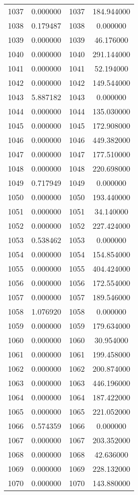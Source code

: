 \documentclass[12pt]{article}
\begin{document}
\begin{longtable}{@{}cccc@{}}
1037 & 0.000000 & 1037 & 184.944000 \\
1038 & 0.179487 & 1038 & 0.000000 \\
1039 & 0.000000 & 1039 & 46.176000 \\
1040 & 0.000000 & 1040 & 291.144000 \\
1041 & 0.000000 & 1041 & 52.194000 \\
1042 & 0.000000 & 1042 & 149.544000 \\
1043 & 5.887182 & 1043 & 0.000000 \\
1044 & 0.000000 & 1044 & 135.030000 \\
1045 & 0.000000 & 1045 & 172.908000 \\
1046 & 0.000000 & 1046 & 449.382000 \\
1047 & 0.000000 & 1047 & 177.510000 \\
1048 & 0.000000 & 1048 & 220.698000 \\
1049 & 0.717949 & 1049 & 0.000000 \\
1050 & 0.000000 & 1050 & 193.440000 \\
1051 & 0.000000 & 1051 & 34.140000 \\
1052 & 0.000000 & 1052 & 227.424000 \\
1053 & 0.538462 & 1053 & 0.000000 \\
1054 & 0.000000 & 1054 & 154.854000 \\
1055 & 0.000000 & 1055 & 404.424000 \\
1056 & 0.000000 & 1056 & 172.554000 \\
1057 & 0.000000 & 1057 & 189.546000 \\
1058 & 1.076920 & 1058 & 0.000000 \\
1059 & 0.000000 & 1059 & 179.634000 \\
1060 & 0.000000 & 1060 & 30.954000 \\
1061 & 0.000000 & 1061 & 199.458000 \\
1062 & 0.000000 & 1062 & 200.874000 \\
1063 & 0.000000 & 1063 & 446.196000 \\
1064 & 0.000000 & 1064 & 187.422000 \\
1065 & 0.000000 & 1065 & 221.052000 \\
1066 & 0.574359 & 1066 & 0.000000 \\
1067 & 0.000000 & 1067 & 203.352000 \\
1068 & 0.000000 & 1068 & 42.636000 \\
1069 & 0.000000 & 1069 & 228.132000 \\
1070 & 0.000000 & 1070 & 143.880000 \\

\end{longtable}
\end{document}
